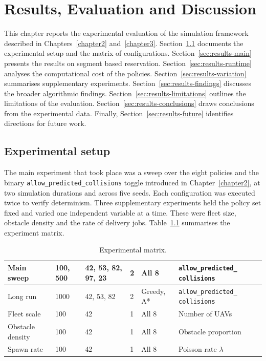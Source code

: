 \chapter{Results, Evaluation and Discussion}
\label{chapter4}

This chapter reports the experimental evaluation of the simulation framework described in Chapters~\ref{chapter2} and~\ref{chapter3}. Section~\ref{sec:results-setup} documents the experimental setup and the matrix of configurations. Section~\ref{sec:results-main} presents the results on segment based reservation. Section~\ref{sec:results-runtime} analyses the computational cost of the policies. Section~\ref{sec:results-variation} summarises supplementary experiments. Section~\ref{sec:results-findings} discusses the broader algorithmic findings. Section~\ref{sec:results-limitations} outlines the limitations of the evaluation. Section~\ref{sec:results-conclusions} draws conclusions from the experimental data. Finally, Section~\ref{sec:results-future} identifies directions for future work.\par

\vspace{1em}

\section{Experimental setup}
\label{sec:results-setup}

The main experiment that took place was a sweep over the eight policies and the binary \texttt{allow\_predicted\_}\allowbreak\texttt{collisions} toggle introduced in Chapter~\ref{chapter2}, at two simulation durations and across five seeds. Each configuration was executed twice to verify determinism. Three supplementary experiments held the policy set fixed and varied one independent variable at a time. These were fleet size, obstacle density and the rate of delivery jobs. Table~\ref{tab:experiment-matrix} summarises the experiment matrix.\par

\vspace{1em}

\begin{table}[h]
\centering
\caption{Experimental matrix.}
\label{tab:experiment-matrix}
\begin{tabular}{|p{}|p{}|p{}|p{}|p{}|p{}|}\hline
Main sweep & 100, 500 & 42, 53, 82, 97, 23 & 2 & All 8 & \texttt{allow\_predicted\_} \newline \texttt{collisions} \\
\hline
Long run & 1000 & 42, 53, 82 & 2 & Greedy, A* & \texttt{allow\_predicted\_} \newline \texttt{collisions} \\
\hline
Fleet scale & 100 & 42 & 1 & All 8 & Number of UAVs \\
\hline
Obstacle density & 100 & 42 & 1 & All 8 & Obstacle proportion \\
\hline
Spawn rate & 100 & 42 & 1 & All 8 & Poisson rate $\lambda$ \\
\hline
\end{tabular}
\end{table}

